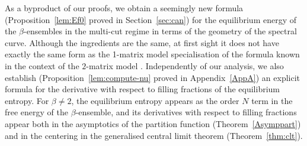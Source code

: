 \documentclass[10pt,a4paper]{amsart}
\numberwithin{equation}{section}
\begin{document}
As a byproduct of our proofs, we obtain a seemingly new formula (Proposition~\ref{lem:Ef0} proved in Section~\ref{sec:can}) for the equilibrium energy of the $\beta$-ensembles in the multi-cut regime in terms of the geometry of the spectral curve. Although the ingredients are the same, at first sight it does not have exactly the same form as the 1-matrix model specialisation of the formula known in the context of the $2$-matrix model \cite{Bertola}. Independently of our analysis, we also establish (Proposition~\ref{lem:compute-nu} proved in Appendix~\ref{AppA}) an explicit formula for the derivative with respect to filling fractions of the equilibrium entropy. For $\beta \neq 2$, the equilibrium entropy appears as the order $N$ term in the free energy of the $\beta$-ensemble, and its derivatives with respect to filling fractions appear both in the asymptotics of the partition function (Theorem~\ref{Asymppart}) and in the centering in the generalised central limit theorem (Theorem~\ref{thm:clt}).
\end{document}
